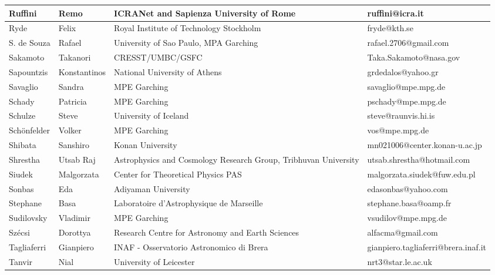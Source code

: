 \begin{center}
\begin{longtable}{|p{1.6cm} |p{1.6cm} |p{2cm} |p{3cm} |}
\tiny Ruffini &\tiny Remo & \tiny ICRANet and Sapienza University of Rome & \tiny ruffini@icra.it \\ \hline
\tiny Ryde &\tiny Felix & \tiny Royal Institute of Technology Stockholm & \tiny fryde@kth.se \\ \hline
\tiny S. de Souza &\tiny Rafael & \tiny University of Sao Paulo, MPA Garching & \tiny rafael.2706@gmail.com \\ \hline
\tiny Sakamoto &\tiny Takanori & \tiny CRESST/UMBC/GSFC & \tiny Taka.Sakamoto@nasa.gov \\ \hline
\tiny Sapountzis &\tiny Konstantinos & \tiny National University of Athens & \tiny grdedalos@yahoo.gr \\ \hline
\tiny Savaglio &\tiny Sandra & \tiny MPE Garching & \tiny savaglio@mpe.mpg.de \\ \hline
\tiny Schady &\tiny Patricia & \tiny MPE Garching & \tiny pschady@mpe.mpg.de \\ \hline
\tiny Schulze &\tiny Steve & \tiny University of Iceland & \tiny steve@raunvis.hi.is \\ \hline
\tiny Sch\"onfelder &\tiny Volker & \tiny MPE Garching & \tiny vos@mpe.mpg.de \\ \hline
\tiny Shibata &\tiny Sanshiro & \tiny Konan University & \tiny mn021006@center.konan-u.ac.jp \\ \hline
\tiny Shrestha &\tiny Utsab Raj & \tiny Astrophysics and Cosmology Research Group, Tribhuvan University & \tiny utsab.shrestha@hotmail.com \\ \hline
\tiny Siudek &\tiny Malgorzata & \tiny Center for Theoretical Physics PAS & \tiny malgorzata.siudek@fuw.edu.pl \\ \hline
\tiny Sonbas &\tiny Eda & \tiny Adiyaman University & \tiny edasonbas@yahoo.com \\ \hline
\tiny Stephane &\tiny Basa & \tiny Laboratoire d'Astrophysique de Marseille & \tiny stephane.basa@oamp.fr \\ \hline
\tiny Sudilovsky &\tiny Vladimir & \tiny MPE Garching & \tiny vsudilov@mpe.mpg.de \\ \hline
\tiny Sz\'ecsi &\tiny Dorottya & \tiny Research Centre for Astronomy and Earth Sciences & \tiny alfacma@gmail.com \\ \hline
\tiny Tagliaferri &\tiny Gianpiero & \tiny INAF - Osservatorio Astronomico di Brera & \tiny gianpiero.tagliaferri@brera.inaf.it \\ \hline
\tiny Tanvir &\tiny Nial & \tiny University of Leicester & \tiny nrt3@star.le.ac.uk \\ \hline

\end{longtable}
\end{center}
